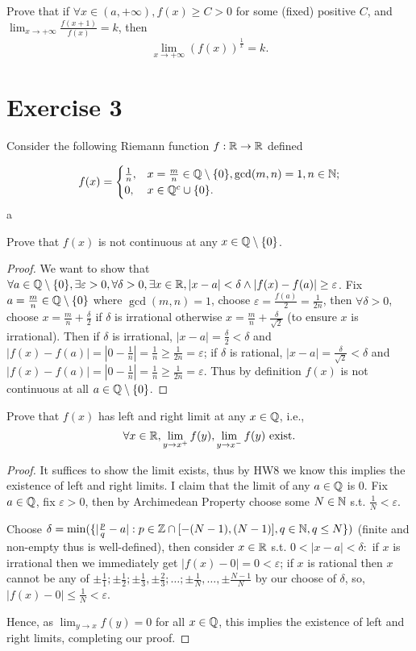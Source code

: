 \documentclass{homework}
\newcommand{\R}{\bb{R}} %
\newcommand{\Q}{\bb{Q}} %
\newcommand{\Z}{\bb{Z}} %
\newcommand{\N}{\bb{N}} %
\newcommand{\ra}{\rightarrow}
\newcommand{\?}{\stackrel{?}{=}}
\newcommand{\ep}{\varepsilon}
\theoremstyle{definition}
\begin{document}
\question[2] Prove that if $\forall x\in (a,+\infty), f(x)\geq C > 0$ for some (fixed) positive $C$, and $\displaystyle\lim_{x\ra+\infty}\frac{f(x+1)}{f(x)}=k$, then \[\lim_{x\ra+\infty}(f(x))^{\frac1x}=k.\]


\newpage
\section*{Exercise 3}

Consider the following Riemann function $f:\R\to\R$ defined

\[f(x)=\begin{cases}
    \frac1n, &x=\frac{m}n\in\Q\setminus\{0\}, \gcd(m,n)=1, n\in\N; \\ 0,& x\in\Q^c\cup\{0\}.
\end{cases}\]a

\question[1] Prove that $f(x)$ is not continuous at any $x\in\Q\setminus\{0\}$.

\begin{proof}
    We want to show that $\forall a\in\Q\setminus\{0\},\exists\ep>0,\forall\delta>0,\exists x\in\R, |x-a|<\delta\land|f(x)-f(a)|\geq\ep$. Fix $a=\frac{m}{n}\in\Q\setminus\{0\}$ where $\gcd(m,n)=1$, choose $\ep=\frac{f(a)}{2}=\frac1{2n}$, then $\forall\delta>0$, choose $x=\frac{m}{n}+\frac{\delta}{2}$ if $\delta$ is irrational otherwise $x=\frac{m}{n}+\frac{\delta}{\sqrt2}$ (to ensure $x$ is irrational). Then if $\delta$ is irrational, $|x-a|=\frac{\delta}{2}<\delta$ and $|f(x)-f(a)|=|0-\frac1n|=\frac1n\geq\frac1{2n}=\ep$; if $\delta$ is rational, $|x-a|=\frac{\delta}{\sqrt2}<\delta$ and $|f(x)-f(a)|=|0-\frac1n|=\frac1n\geq\frac1{2n}=\ep$. Thus by definition $f(x)$ is not continuous at all $a\in\Q\setminus\{0\}$.
\end{proof}

\question[2] Prove that $f(x)$ has left and right limit at any $x\in\Q$, i.e., \[\forall x\in\R, \displaystyle\lim_{y\ra x^+}f(y), \lim_{y\ra x^-}f(y)\text{ exist.}\]

\begin{proof}
    It suffices to show the limit exists, thus by HW8 we know this implies the existence of left and right limits. I claim that the limit of any $a\in\Q$ is $0$. Fix $a\in\Q$, fix $\ep>0$, then by Archimedean Property choose some $N\in\N$ s.t. $\frac1N<\ep$. 

    Choose $\delta=\min(\{|\frac{p}{q}-a|:p\in\Z\cap[-(N-1), (N-1)], q\in\N, q\leq N\})$ (finite and non-empty thus is well-defined), then consider $x\in\R$ s.t. $0<|x-a|<\delta:$ if $x$ is irrational then we immediately get $|f(x)-0|=0<\ep$; if $x$ is rational then $x$ cannot be any of $\pm\frac11; \pm\frac12; \pm\frac13, \pm\frac23; \ldots; \pm\frac1N, \ldots, \pm\frac{N-1}{N}$ by our choose of $\delta$, so, $|f(x)-0|\leq\frac1{N}<\ep$.

    Hence, as $\displaystyle\lim_{y\ra x}f(y)=0$ for all $x\in\Q$, this implies the existence of left and right limits, completing our proof.

\end{proof}
\end{document}
